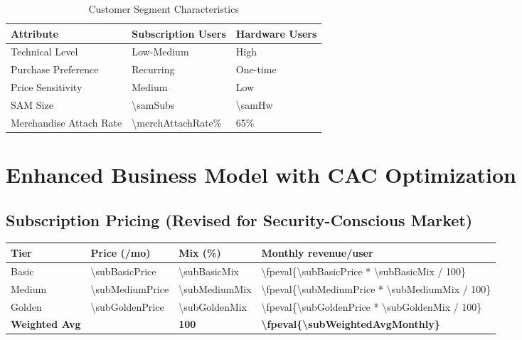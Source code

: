\documentclass[11pt]{article}
\newcommand{\numfpeval}[1]{\num{\fpeval{#1}}}
\begin{document}
\begin{table}[H]
\centering
\caption{Customer Segment Characteristics}
\begin{tabularx}{\linewidth}{l X X}
\toprule
Attribute & Subscription Users & Hardware Users \\\midrule
Technical Level & Low-Medium & High \\
Purchase Preference & Recurring & One-time \\
Price Sensitivity & Medium & Low \\
SAM Size & \num{\samSubs}\cite{chainalysis2024,triple2023} & \num{\samHw}\cite{chainalysis2024,triple2023} \\
Merchandise Attach Rate & \num{\merchAttachRate}\%\cite{shopify2024} & \num{65}\%\cite{shopify2024} \\
\bottomrule
\end{tabularx}
\end{table}

\section{Enhanced Business Model with CAC Optimization}

\subsection{Subscription Pricing (Revised for Security-Conscious Market)}
\begin{table}[H]
\centering
\begin{tabularx}{\linewidth}{l Y Y Y}
\toprule
Tier & Price (/mo) & Mix (\%) & Monthly revenue/user \\\midrule
Basic   & \num{\subBasicPrice}  & \num{\subBasicMix} & \numfpeval{\subBasicPrice * \subBasicMix / 100} \\
Medium  & \num{\subMediumPrice} & \num{\subMediumMix} & \numfpeval{\subMediumPrice * \subMediumMix / 100} \\
Golden  & \num{\subGoldenPrice} & \num{\subGoldenMix} & \numfpeval{\subGoldenPrice * \subGoldenMix / 100} \\\midrule
\textbf{Weighted Avg} &  & \textbf{\num{100}} & \textbf{\numfpeval{\subWeightedAvgMonthly}} \\
\bottomrule
\end{tabularx}
\end{table}
\end{document}
